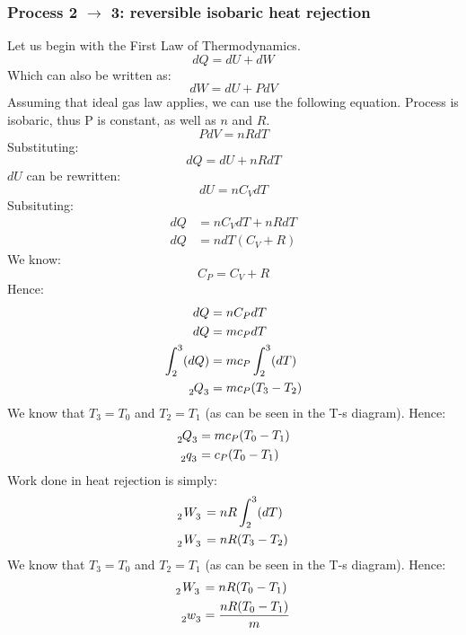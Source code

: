 \documentclass[12pt]{article}
\numberwithin{equation}{section}
\begin{document}
\begin{flushleft}
\subsubsection*{Process 2 $\rightarrow$ 3: reversible isobaric heat rejection}
Let us begin with the First Law of Thermodynamics.
\begin{equation}
  dQ = dU + dW
\end{equation}
Which can also be written as:
\begin{equation}
  dW = dU + PdV
\end{equation}
Assuming that ideal gas law applies, we can use the following equation. Process is isobaric, thus P is constant, as well as $n$ and $R$.
\begin{equation}
  PdV = nRdT
\end{equation}
Substituting:
\begin{equation}
  dQ = dU + nRdT
\end{equation}
$dU$ can be rewritten:
\begin{equation}
  dU = nC_V dT 
\end{equation}
Subsituting:
\begin{align}
  dQ &= nC_V dT + nRdT\\
  dQ &= ndT (C_V + R)
\end{align}
We know:
\begin{equation}
  C_P = C_V +R 
\end{equation}
Hence:
\begin{align}
  dQ &= nC_P dT\\
  dQ &= mc_P dT\\
  \int_2^3 (dQ) &= mc_P \int_2^3 (dT)\\
  \tensor[_2]{Q}{_3} &= mc_P (T_3 - T_2)
\end{align}
We know that $T_3 = T_0$ and $T_2 = T_1$ (as can be seen in the T-s diagram). Hence:
\begin{align}
  \tensor[_2]{Q}{_3} &= mc_P (T_0 - T_1)\\
  \tensor[_2]{q}{_3} &= c_P (T_0 - T_1)
\end{align}
Work done in heat rejection is simply:
\begin{align}
  \tensor[_2]{W}{_3} &= nR\int_2^3(dT)\\
  \tensor[_2]{W}{_3} &= nR(T_3 - T_2)
\end{align}
We know that $T_3 = T_0$ and $T_2 = T_1$ (as can be seen in the T-s diagram). Hence:
\begin{align}
  \tensor[_2]{W}{_3} &= nR(T_0 - T_1)\\
  \tensor[_2]{w}{_3} &= \frac{nR(T_0 - T_1)}{m}
\end{align}

\end{flushleft}
\end{document}
